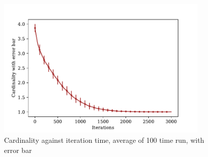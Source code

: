 \documentclass[a4paper,12pt]{article}
\begin{document}
	\begin{figure}[H]
		\centering
		\includegraphics[width=0.9\textwidth]{card_errbarnorm1_200_3000_100}
		\caption{Cardinality against iteration time, average of 100 time run, with error bar}\label{card_errbarnorm1_200_3000_100}
	\end{figure}
\end{document}
